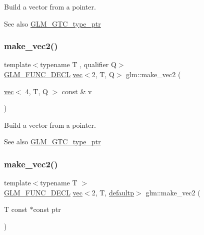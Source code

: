 Build a vector from a pointer. \begin{DoxySeeAlso}{See also}
\hyperlink{group__gtc__type__ptr}{G\+L\+M\+\_\+\+G\+T\+C\+\_\+type\+\_\+ptr} 
\end{DoxySeeAlso}
\mbox{\label{group__gtc__type__ptr_ga2b81f71f3a222fe5bba81e3983751249}} 
\subsubsection{\texorpdfstring{make\+\_\+vec2()}{make\_vec2()}\hspace{0.1cm}{\footnotesize\ttfamily [4/5]}}
{\footnotesize\ttfamily template$<$typename T , qualifier Q$>$ \\
\hyperlink{setup_8hpp_ab2d052de21a70539923e9bcbf6e83a51}{G\+L\+M\+\_\+\+F\+U\+N\+C\+\_\+\+D\+E\+CL} \hyperlink{structglm_1_1vec}{vec}$<$2, T, Q$>$ glm\+::make\+\_\+vec2 (\begin{DoxyParamCaption}\item[{\hyperlink{structglm_1_1vec}{vec}$<$ 4, T, Q $>$ const \&}]{v }\end{DoxyParamCaption})\hspace{0.3cm}{\ttfamily [inline]}}

Build a vector from a pointer. \begin{DoxySeeAlso}{See also}
\hyperlink{group__gtc__type__ptr}{G\+L\+M\+\_\+\+G\+T\+C\+\_\+type\+\_\+ptr} 
\end{DoxySeeAlso}
\mbox{\label{group__gtc__type__ptr_ga81253cf7b0ebfbb1e70540c5774e6824}} 
\subsubsection{\texorpdfstring{make\+\_\+vec2()}{make\_vec2()}\hspace{0.1cm}{\footnotesize\ttfamily [5/5]}}
{\footnotesize\ttfamily template$<$typename T $>$ \\
\hyperlink{setup_8hpp_ab2d052de21a70539923e9bcbf6e83a51}{G\+L\+M\+\_\+\+F\+U\+N\+C\+\_\+\+D\+E\+CL} \hyperlink{structglm_1_1vec}{vec}$<$2, T, \hyperlink{namespaceglm_a36ed105b07c7746804d7fdc7cc90ff25a9d21ccd8b5a009ec7eb7677befc3bf51}{defaultp}$>$ glm\+::make\+\_\+vec2 (\begin{DoxyParamCaption}\item[{T const $\ast$const}]{ptr }\end{DoxyParamCaption})}

